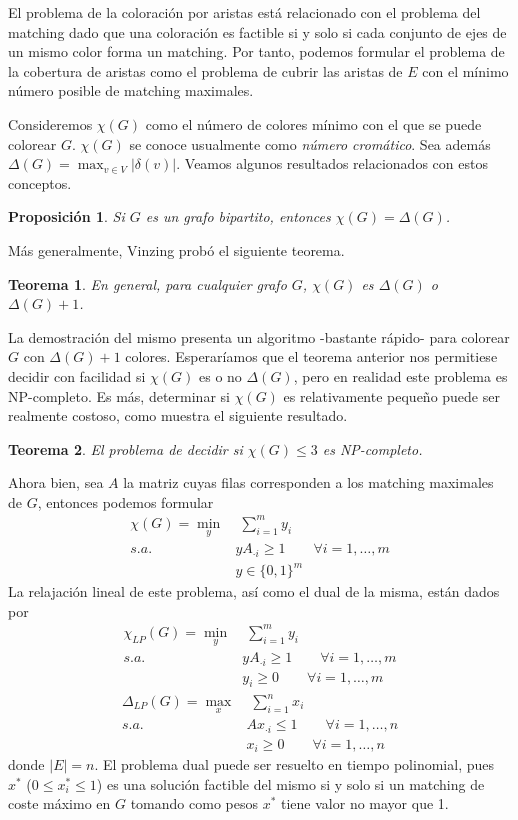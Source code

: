 \documentclass[twoside,a4paper,openright,12pt,tikz]{book}
\newtheorem{prop}{Proposici\'on}[section]
\newtheorem{thm}{Teorema}[section]
\begin{document}
El problema de la coloración por aristas está relacionado con el problema del matching dado que una coloración es factible si y solo si cada conjunto de ejes de un mismo color forma un matching. Por tanto, podemos formular el problema de la cobertura de aristas como el problema de cubrir las aristas de $E$ con el mínimo número posible de matching maximales. 

Consideremos $\chi(G)$ como el número de colores mínimo con el que se puede colorear $G$. $\chi(G)$ se conoce usualmente como \textit{número cromático}. Sea además $\Delta(G) = \max_{v\in V} |\delta(v)|$. Veamos algunos resultados relacionados con estos conceptos.
\begin{prop}
Si $G$ es un grafo bipartito, entonces $\chi(G)=\Delta(G)$. 
\end{prop}
Más generalmente, Vinzing probó el siguiente teorema.
\begin{thm}
En general, para cualquier grafo $G$, $\chi(G)$ es $\Delta(G)$ o $\Delta(G)+1$. 
\end{thm}
La demostración del mismo presenta un algoritmo -bastante rápido- para colorear $G$ con $\Delta(G)+1$ colores. Esperaríamos que el teorema anterior nos permitiese decidir con facilidad si $\chi(G)$ es o no $\Delta(G)$, pero en realidad este problema es NP-completo. Es más, determinar si $\chi(G)$ es relativamente pequeño puede ser realmente costoso, como muestra el siguiente resultado.
\begin{thm}
El problema de decidir si $\chi(G)\leq 3$ es NP-completo.
\end{thm}
Ahora bien, sea $A$ la matriz cuyas filas corresponden a los matching maximales de $G$, entonces podemos formular
\begin{align*}
\chi(G)=\min_{y} &\; \sum_{i=1}^m  y_{i}  \nonumber\\ 
s.a.\;  &  yA_{\cdot i} \geq  1 \qquad \forall i=1,\dotsc,m\\
& y\in\{0,1\}^{m}\nonumber
\end{align*}
La relajación lineal de este problema, así como el dual de la misma, están dados por
\begin{align*}
\chi_{LP}(G)=\min_{y} &\; \sum_{i=1}^m  y_{i}  \nonumber\\ 
s.a.\;  &  yA_{\cdot i} \geq  1 \qquad \forall i=1,\dotsc,m\\
& y_i \geq 0  \qquad \forall i=1,\dotsc,m 
\end{align*}
\begin{align*}
\Delta_{LP}(G)=\max_{x} &\; \sum_{i=1}^n  x_i  \nonumber\\ 
s.a.\;  &  Ax_{\cdot i} \leq  1 \qquad \forall i=1,\dotsc,n\\
& x_i\geq 0  \qquad \forall i=1,\dotsc,n
\end{align*}
donde $|E|=n$. El problema dual puede ser resuelto en tiempo polinomial, pues $x^*$ ($0\leq x^*_i \leq 1$) es una solución factible del mismo si y solo si un matching de coste máximo en $G$ tomando como pesos $x^*$ tiene valor no mayor que 1.
\end{document}
